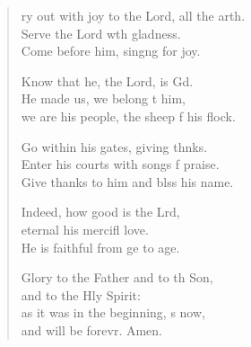 \settowidth{\versewidth}{Cry out with joy to the Lord, all the earth. +}
\begin{verse}%
  \begin{patverse}
ry out with joy to the Lord, all the arth.\Flex\\
Serve the Lord w\pointup{\i}th gladness.\Med\\
Come before him, sing\pointup{\i}ng for joy.

Know that he, the Lord, is Gd.\Flex\\
He made us, we belong t him,\Med\\
we are his people, the sheep f his flock.

Go within his gates, giving thnks.\Flex\\
Enter his courts with songs f praise.\Med\\
Give thanks to him and blss his name.

Indeed, how good is the Lrd,\Flex\\
eternal his mercifl love.\Med\\
He is faithful from ge to age.

Glory to the Father and to th Son,\Med\\
and to the Hly Spirit:\\
as it was in the beginning, \pointup{\i}s now,\Med\\
and will be forevr. Amen.
  \end{patverse}
\end{verse}
